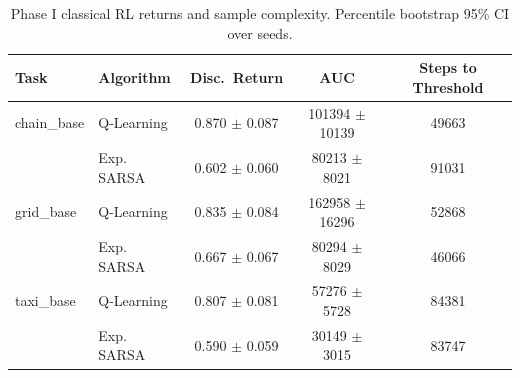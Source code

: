 \begin{table}[t]
\centering
\caption{Phase I classical RL returns and sample complexity. Percentile bootstrap 95\% CI over seeds.}
\label{tab:p1c}
\begin{tabular}{llccc}
\toprule
Task & Algorithm & Disc.\ Return & AUC & Steps to Threshold \\
\midrule
  chain\_base & Q-Learning & 0.870 $\pm$ 0.087 & 101394 $\pm$ 10139 & 49663 \\
   & Exp. SARSA & 0.602 $\pm$ 0.060 & 80213 $\pm$ 8021 & 91031 \\
\midrule
  grid\_base & Q-Learning & 0.835 $\pm$ 0.084 & 162958 $\pm$ 16296 & 52868 \\
   & Exp. SARSA & 0.667 $\pm$ 0.067 & 80294 $\pm$ 8029 & 46066 \\
\midrule
  taxi\_base & Q-Learning & 0.807 $\pm$ 0.081 & 57276 $\pm$ 5728 & 84381 \\
   & Exp. SARSA & 0.590 $\pm$ 0.059 & 30149 $\pm$ 3015 & 83747 \\
\bottomrule
\end{tabular}
\end{table}
